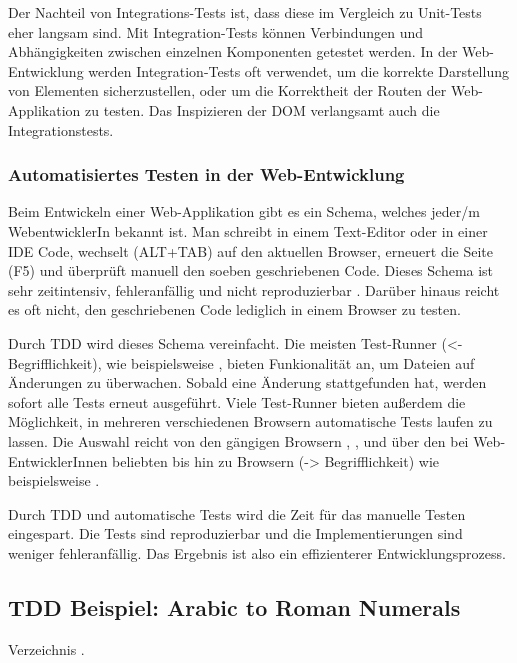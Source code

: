{Der Nachteil von Integrations-Tests ist, dass diese im Vergleich zu Unit-Tests eher langsam sind. Mit Integration-Tests können Verbindungen und Abhängigkeiten zwischen einzelnen Komponenten getestet werden. In der Web-Entwicklung werden Integration-Tests oft verwendet, um die korrekte Darstellung von Elementen sicherzustellen, oder um die Korrektheit der Routen der Web-Applikation zu testen. 
Das Inspizieren der DOM verlangsamt auch die Integrationstests.

\subsubsection{Automatisiertes Testen in der Web-Entwicklung}
Beim Entwickeln einer Web-Applikation gibt es ein Schema, welches jeder/m WebentwicklerIn bekannt ist. Man schreibt in einem Text-Editor oder in einer IDE Code, wechselt (ALT+TAB) auf den aktuellen Browser, erneuert die Seite (F5) und überprüft manuell den soeben geschriebenen Code. Dieses Schema ist sehr zeitintensiv, fehleranfällig und nicht reproduzierbar \autocite[3]{Johansen:2011}. Darüber hinaus reicht es oft nicht, den geschriebenen Code lediglich in einem Browser zu testen.

Durch TDD wird dieses Schema vereinfacht. Die meisten Test-Runner (<- Begrifflichkeit), wie beispielsweise , bieten Funkionalität an, um Dateien auf Änderungen zu überwachen. Sobald eine Änderung stattgefunden hat, werden sofort alle Tests erneut ausgeführt. Viele Test-Runner bieten außerdem die Möglichkeit, in mehreren verschiedenen Browsern automatische Tests laufen zu lassen. Die Auswahl reicht von den gängigen Browsern , ,  und  über den bei Web-EntwicklerInnen beliebten  bis hin zu  Browsern (-> Begrifflichkeit) wie beispielsweise .

Durch TDD und automatische Tests wird die Zeit für das manuelle Testen eingespart. Die Tests sind reproduzierbar und die Implementierungen sind weniger fehleranfällig. Das Ergebnis ist also ein effizienterer Entwicklungsprozess.

\subsection{TDD Beispiel: Arabic to Roman Numerals}
Verzeichnis .


}
